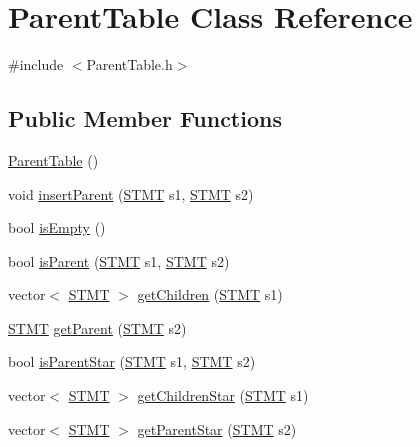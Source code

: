 \hypertarget{class_parent_table}{\section{Parent\-Table Class Reference}
\label{class_parent_table}
}


{\ttfamily \#include $<$Parent\-Table.\-h$>$}

\subsection*{Public Member Functions}
\begin{DoxyCompactItemize}
\item 
\hyperlink{class_parent_table_a3fa054014eba4cb913f1b9245263857d}{Parent\-Table} ()
\item 
void \hyperlink{class_parent_table_a775e3418a8653096b53276af58715c36}{insert\-Parent} (\hyperlink{std_afx_8h_a4a876b28ac3f59cecb39c2d2d76e4e7a}{S\-T\-M\-T} s1, \hyperlink{std_afx_8h_a4a876b28ac3f59cecb39c2d2d76e4e7a}{S\-T\-M\-T} s2)
\item 
bool \hyperlink{class_parent_table_ad7e627299fad7b2725558efb4e5b3105}{is\-Empty} ()
\item 
bool \hyperlink{class_parent_table_a879660be86e4983a0199ce0a74b59488}{is\-Parent} (\hyperlink{std_afx_8h_a4a876b28ac3f59cecb39c2d2d76e4e7a}{S\-T\-M\-T} s1, \hyperlink{std_afx_8h_a4a876b28ac3f59cecb39c2d2d76e4e7a}{S\-T\-M\-T} s2)
\item 
vector$<$ \hyperlink{std_afx_8h_a4a876b28ac3f59cecb39c2d2d76e4e7a}{S\-T\-M\-T} $>$ \hyperlink{class_parent_table_a86302e8f70ace7674fd2184654c156a8}{get\-Children} (\hyperlink{std_afx_8h_a4a876b28ac3f59cecb39c2d2d76e4e7a}{S\-T\-M\-T} s1)
\item 
\hyperlink{std_afx_8h_a4a876b28ac3f59cecb39c2d2d76e4e7a}{S\-T\-M\-T} \hyperlink{class_parent_table_ae53225a6ba566239960cca6783983a7b}{get\-Parent} (\hyperlink{std_afx_8h_a4a876b28ac3f59cecb39c2d2d76e4e7a}{S\-T\-M\-T} s2)
\item 
bool \hyperlink{class_parent_table_abdad8cbd9c06af20257361dbbb35fe2d}{is\-Parent\-Star} (\hyperlink{std_afx_8h_a4a876b28ac3f59cecb39c2d2d76e4e7a}{S\-T\-M\-T} s1, \hyperlink{std_afx_8h_a4a876b28ac3f59cecb39c2d2d76e4e7a}{S\-T\-M\-T} s2)
\item 
vector$<$ \hyperlink{std_afx_8h_a4a876b28ac3f59cecb39c2d2d76e4e7a}{S\-T\-M\-T} $>$ \hyperlink{class_parent_table_af10014b72f9b69bc3e58f251ce7d60c0}{get\-Children\-Star} (\hyperlink{std_afx_8h_a4a876b28ac3f59cecb39c2d2d76e4e7a}{S\-T\-M\-T} s1)
\item 
vector$<$ \hyperlink{std_afx_8h_a4a876b28ac3f59cecb39c2d2d76e4e7a}{S\-T\-M\-T} $>$ \hyperlink{class_parent_table_a01f37ca19b8e3f56d86279f1884e5380}{get\-Parent\-Star} (\hyperlink{std_afx_8h_a4a876b28ac3f59cecb39c2d2d76e4e7a}{S\-T\-M\-T} s2)
\end{DoxyCompactItemize}


